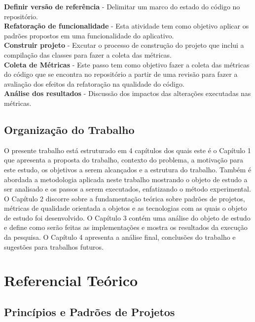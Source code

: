 \documentclass[conference]{IEEEtran}
\begin{document}
\textbf{Definir versão de referência} - Delimitar um marco do estado do código
no repositório. \\
\indent\textbf{Refatoração de funcionalidade} - Esta atividade tem como objetivo
aplicar os padrões propostos em uma funcionalidade do aplicativo.\\
\indent\textbf{Construir projeto} - Excutar o processo de construção do projeto
que inclui a compilação das classes para fazer a coleta das métricas.\\
\indent\textbf{Coleta de Métricas} - Este passo tem como objetivo fazer a coleta
das métricas do código que se encontra no repositório a partir de uma revisão
para fazer a avaliação dos efeitos da refatoração na qualidade do código.\\
\indent\textbf{Análise dos resultados} - Discussão dos impactos das alterações
executadas nas métricas.\\



\subsection{Organização do Trabalho}

O presente trabalho está estruturado em 4 capítulos dos quais este é o
Capítulo 1 que apresenta a proposta do trabalho, contexto do problema, a
motivação para este estudo, os objetivos a serem alcançados e a estrutura do
trabalho. Também é abordada a metodologia aplicada neste trabalho mostrando o
objeto de estudo a ser analisado e os passos a serem executados, enfatizando o
método experimental.
O Capítulo 2 discorre sobre a fundamentação teórica sobre padrões de projetos,
métricas de qualidade orientada a objetos e as tecnologias com as quais o objeto
de estudo foi desenvolvido.
O Capítulo 3 contém uma análise do objeto de estudo e define como serão feitas
as implementações e mostra os resultados da execução da pesquisa.
O Capítulo 4 apresenta a análise final, conclusões do trabalho e sugestões para
trabalhos futuros.


\section{Referencial Teórico}

\subsection{Princípios e Padrões de Projetos}
\end{document}

